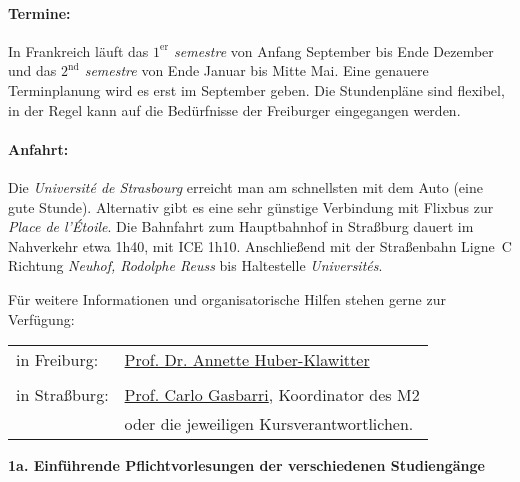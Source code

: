 \documentclass[a4paper,10pt]{article}
\begin{document}
\paragraph{Termine:} In Frankreich läuft das \emph{$1^{\mathrm{er}}$ semestre} von Anfang September bis Ende Dezember
und das \emph{$2^{\mathrm{nd}}$ semestre} von Ende Januar bis Mitte Mai.
Eine genauere Terminplanung wird es erst im September geben.
Die Stundenpläne sind flexibel, in der Regel kann auf die Bedürfnisse der Freiburger eingegangen werden.

\paragraph{Anfahrt:} Die \emph{Universit\'e de Strasbourg} erreicht man am schnellsten mit dem Auto (eine gute Stunde).
Alternativ gibt es eine sehr günstige Verbindung mit Flixbus zur \emph{Place de l'\'Etoile}. 
Die Bahnfahrt zum Hauptbahnhof in Straßburg dauert im Nahverkehr etwa 1h40, mit ICE 1h10.
Anschließend mit der Straßenbahn Ligne~C Richtung \emph{Neuhof, Rodolphe Reuss} bis Haltestelle \emph{Universit\'es}. 

\medskip
Für weitere Informationen und organisatorische Hilfen stehen gerne zur Verfügung:

\begin{tabular}{@{}ll@{}}
{in Freiburg:} & \href{mailto:annette.huber@math.uni-freiburg.de}{Prof. Dr. Annette Huber-Klawitter} \\
& \\[-1ex] 
{in Straßburg:} & \href{mailto:gasbarri@math.unistra.fr}{Prof. Carlo Gasbarri}, Koordinator des M2 \\
& oder die jeweiligen Kursverantwortlichen.
\end{tabular}








\clearpage
{}
\thispagestyle{empty}
\vspace*{\fill}
\begin{center}
    \Huge\bfseries 1a. Einführende Pflichtvorlesungen der verschiedenen Studiengänge
\end{center}
\vspace*{\fill}\vspace*{\fill}\clearpage
\vfill
\thispagestyle{empty}
\clearpage
\end{document}

